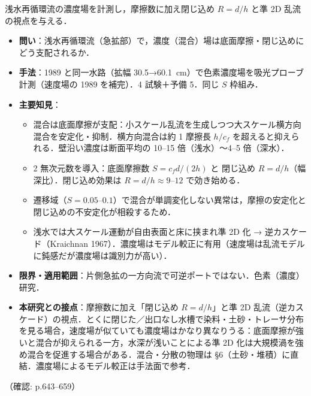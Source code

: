 \documentclass[11pt]{jsarticle}
\newcommand{\litref}[1]{{\large\bfseries\color{citecolor}#1}}
\begin{document}
\noindent\litref{Babarutsi \& Chu (1991)}\quad 浅水再循環流の濃度場を計測し，摩擦数に加え閉じ込め $R=d/h$ と準 2D 乱流の視点を与える．
\begin{itemize}
  \item \textbf{問い}：浅水再循環流（急拡部）で，濃度（混合）場は底面摩擦・閉じ込めにどう支配されるか．
  \item \textbf{手法}：1989 と同一水路（拡幅 30.5→60.1~cm）で色素濃度場を吸光プローブ計測（速度場の 1989 を補完）．4 試験＋予備 5．同じ $S$ 枠組み．
  \item \textbf{主要知見}：
  \begin{itemize}
    \item 混合は底面摩擦が支配：小スケール乱流を生成しつつ大スケール横方向混合を安定化・抑制．横方向混合は約 1 摩擦長 $h/c_f$ を超えると抑えられる．壁沿い濃度は断面平均の 10--15 倍（浅水）〜4--5 倍（深水）．
    \item 2 無次元数を導入：底面摩擦数 $S=c_f d/(2h)$ と 閉じ込め $R=d/h$（幅深比）．閉じ込め効果は $R=d/h \approx 9$--$12$ で効き始める．
    \item 遷移域（$S=0.05$--$0.1$）で混合が単調変化しない異常は，摩擦の安定化と閉じ込めの不安定化が相殺するため．
    \item 浅水では大スケール運動が自由表面と床に挟まれ準 2D 化 → 逆カスケード（Kraichnan 1967）．濃度場はモデル較正に有用（速度場は乱流モデルに鈍感だが濃度場は識別力が高い）．
  \end{itemize}
  \item \textbf{限界・適用範囲}：片側急拡の一方向流で可逆ポートではない．色素（濃度）研究．
  \item \textbf{本研究との接点}：摩擦数に加え「閉じ込め $R=d/h$」と準 2D 乱流（逆カスケード）の視点．とくに閉じた／出口なし水槽で染料・土砂・トレーサ分布を見る場合，速度場が似ていても濃度場はかなり異なりうる：底面摩擦が強いと混合が抑えられる一方，水深が浅いことによる準 2D 化は大規模渦を強め混合を促進する場合がある．混合・分散の物理は §6（土砂・堆積）に直結．濃度場によるモデル較正は手法面で参考．
\end{itemize}
\noindent（確認: p.643--659）
\end{document}
